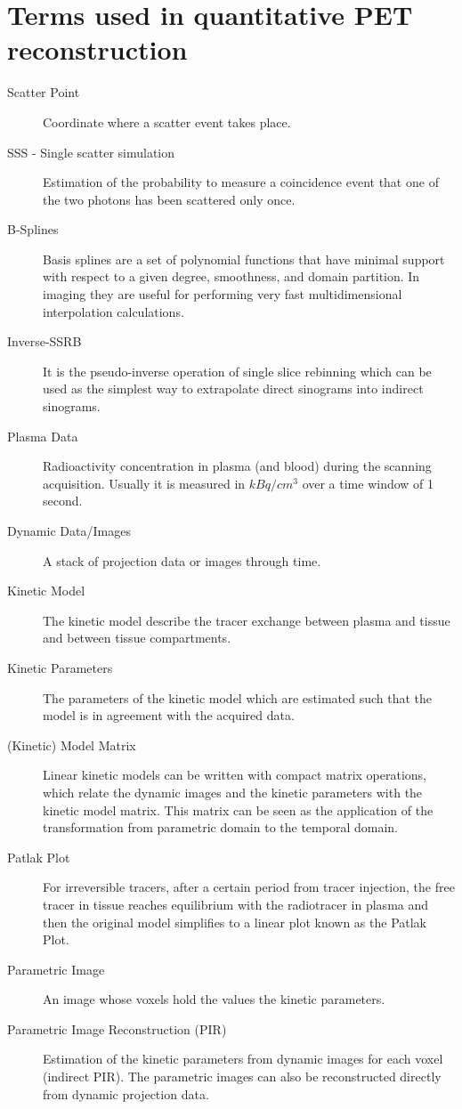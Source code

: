 \documentclass{article}
\begin{document}
\section*{Terms used in quantitative PET reconstruction}
\begin{description}
\item[Scatter Point]
Coordinate where a scatter event takes place. 
\item[SSS - Single scatter simulation]
Estimation of the probability to measure a coincidence event that one of
the two photons has been scattered only once. 
\item[B-Splines]
Basis splines are a set of polynomial functions that have minimal support with 
respect to a given degree, smoothness, and domain partition. In imaging they 
are useful for performing very fast multidimensional interpolation calculations.
\item[Inverse-SSRB]
It is the pseudo-inverse operation of single slice rebinning which can be used 
as the simplest way to extrapolate direct sinograms into indirect sinograms. 
\item[Plasma Data]
Radioactivity concentration in plasma (and blood) during the scanning acquisition.
Usually it is measured in $\mathit{kBq/cm^3}$ over a time window of 1 second. 
\item[Dynamic Data/Images]
A stack of projection data or images through time.
\item[Kinetic Model]
The kinetic model describe the tracer exchange between plasma and tissue 
and between tissue compartments.
\item[Kinetic Parameters]
The parameters of the kinetic model which are estimated such that 
the model is in agreement with the acquired data. 
\item[(Kinetic) Model Matrix]
Linear kinetic models can be written with compact matrix operations, which 
relate the dynamic images and the kinetic parameters with the kinetic model matrix. 
This matrix can be seen as the application of the transformation from parametric 
domain to the temporal domain. 
\item[Patlak Plot]
For irreversible tracers, after a certain period from tracer injection, 
the free tracer in tissue reaches equilibrium with the radiotracer in plasma and 
then the original model simplifies to a linear plot known as the Patlak Plot.
\item[Parametric Image]
An image whose voxels hold the values the kinetic parameters.
\item[Parametric Image Reconstruction (PIR)]
Estimation of the kinetic parameters from dynamic images for each voxel (indirect PIR). 
The parametric images can also be reconstructed directly from dynamic projection data. 
\end{description}
\end{document}
